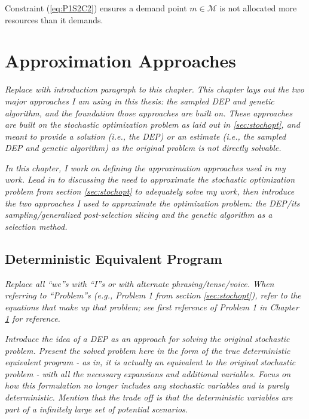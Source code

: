 \documentclass[12pt,dvipsnames]{report}
\begin{document}
Constraint (\ref{eq:P1S2C2}) ensures a demand point $m \in \mathcal{M}$ is not allocated more resources than it demands.
\fi

\iftrue
\pagebreak
\chapter{Approximation Approaches} \label{ch:approaches}


\textit{Replace with introduction paragraph to this chapter.  This chapter lays out the two major approaches I am using in this thesis: the sampled DEP and genetic algorithm, and the foundation those approaches are built on.  These approaches are built on the stochastic optimization problem as laid out in \ref{sec:stochopt}, and meant to provide a solution (i.e., the DEP) or an estimate (i.e., the sampled DEP and genetic algorithm) as the original problem is not directly solvable.}

\textit{In this chapter, I work on defining the approximation approaches used in my work.  Lead in to discussing the need to approximate the stochastic optimization problem from section \ref{sec:stochopt} to adequately solve my work, then introduce the two approaches I used to approximate the optimization problem: the DEP/its sampling/generalized post-selection slicing and the genetic algorithm as a selection method.}

\section{Deterministic Equivalent Program} \label{sec:dep}

\textit{Replace all ``we''s with ``I''s or with alternate phrasing/tense/voice.  When referring to ``Problem''s (e.g., Problem 1 from section \ref{sec:stochopt}), refer to the equations that make up that problem; see first reference of Problem 1 in Chapter \ref{ch:approaches} for reference.}

\textit{Introduce the idea of a DEP as an approach for solving the original stochastic problem.  Present the solved problem here in the form of the true deterministic equivalent program - as in, it is actually an equivalent to the original stochastic problem - with all the necessary expansions and additional variables.  Focus on how this formulation no longer includes any stochastic variables and is purely deterministic.  Mention that the trade off is that the deterministic variables are part of a infinitely large set of potential scenarios.}
\end{document}
